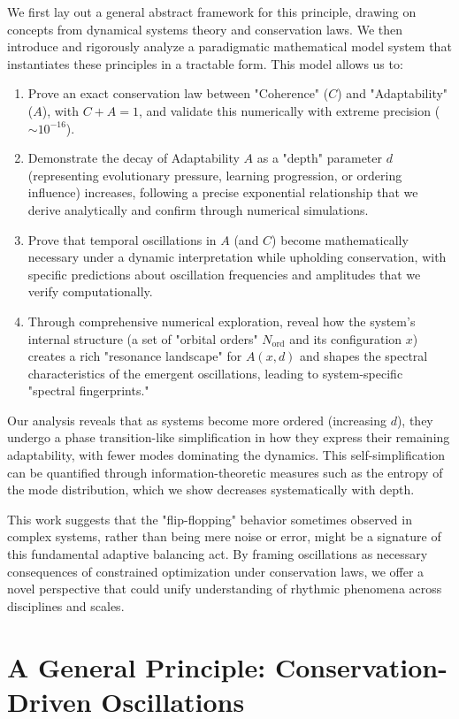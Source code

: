 \documentclass[11pt,a4paper]{article}
\begin{document}
We first lay out a general abstract framework for this principle, drawing on concepts from dynamical systems theory and conservation laws. We then introduce and rigorously analyze a paradigmatic mathematical model system that instantiates these principles in a tractable form. This model allows us to:
\begin{enumerate}
    \item Prove an exact conservation law between "Coherence" ($C$) and "Adaptability" ($A$), with $C+A=1$, and validate this numerically with extreme precision ($\sim 10^{-16}$).
    \item Demonstrate the decay of Adaptability $A$ as a "depth" parameter $d$ (representing evolutionary pressure, learning progression, or ordering influence) increases, following a precise exponential relationship that we derive analytically and confirm through numerical simulations.
    \item Prove that temporal oscillations in $A$ (and $C$) become mathematically necessary under a dynamic interpretation while upholding conservation, with specific predictions about oscillation frequencies and amplitudes that we verify computationally.
    \item Through comprehensive numerical exploration, reveal how the system's internal structure (a set of "orbital orders" $N_{\text{ord}}$ and its configuration $x$) creates a rich "resonance landscape" for $A(x,d)$ and shapes the spectral characteristics of the emergent oscillations, leading to system-specific "spectral fingerprints."
\end{enumerate}

Our analysis reveals that as systems become more ordered (increasing $d$), they undergo a phase transition-like simplification in how they express their remaining adaptability, with fewer modes dominating the dynamics. This self-simplification can be quantified through information-theoretic measures such as the entropy of the mode distribution, which we show decreases systematically with depth.

This work suggests that the "flip-flopping" behavior sometimes observed in complex systems, rather than being mere noise or error, might be a signature of this fundamental adaptive balancing act. By framing oscillations as necessary consequences of constrained optimization under conservation laws, we offer a novel perspective that could unify understanding of rhythmic phenomena across disciplines and scales.

\section{A General Principle: Conservation-Driven Oscillations}
\end{document}
